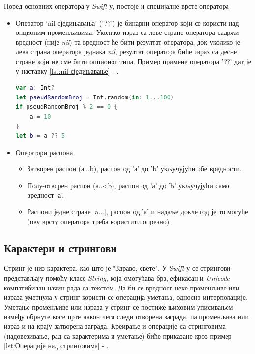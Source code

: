 \documentclass[12pt,oneside]{memoir}
\begin{document}
\indent Поред основних оператора у \textit{Swift}-у, постоје и специјалне врсте оператора

\begin{itemize}
    \item Оператор 'nil-сједињавања' ('??') је бинарни оператор који се користи над опционим променљивима. Уколико израз са леве стране оператора садржи вредност (није \textit{nil}) та вредност ће бити резултат оператора, док уколико је лева страна оператора једнака  \textit{nil}, резултат оператора биће израз са десне стране који не сме бити опционог типа. Пример примене оператора '??' дат је у наставку \ref{lst:nil-сједињавање} - .
    
\begin{lstlisting}[caption=\textit{{nil-сједињавање}}, label={lst:nil-сједињавање}, language=Swift, frame=single]
var a: Int?
let pseudRandomBroj = Int.random(in: 1...100)
if pseudRandomBroj % 2 == 0 {
    a = 10
}
let b = a ?? 5
\end{lstlisting}
    
    \item Оператори распона
    
\begin{itemize}
    \item Затворен распон (а...b), распон од 'а' до 'b' укључујући обе вредности.
    \item Полу-отворен распон (а..<b), распон од 'а' до 'b' укључујући само вредност 'а'.
    \item Распони једне стране [a...], распон од 'а' и надаље докле год је то могуће (ову врсту оператора треба користити опрезно).
\end{itemize}

\end{itemize}

\subsection{Карактери и стрингови}

\indent Стринг је низ карактера, као што је "Здраво, свете". У \textit{Swift}-у се стрингови представљају помоћу класе \textit{String}, која омогућава брз, ефикасан и \textit{Unicode}-компатибилан начин рада са текстом. Да би се вредност неке променљиве или израза уметнула у стринг користи се операција уметања, односно интерполације. Уметање променљиве или израза у стринг се постиже њиховим уписивањем између обрнуте косе црте након чега следи отворена заграда, па променљива или израз и на крају затворена заграда. Креирање и операције са стринговима (надовезивање, рад са карактерима и уметање) биће приказане кроз пример \ref{lst:Операције над стринговима} - .
\end{document}
